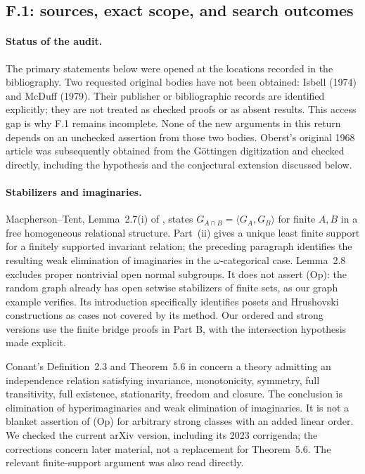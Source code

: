 \subsection{F.1: sources, exact scope, and search outcomes}

\paragraph{Status of the audit.}
The primary statements below were opened at the locations recorded
in the bibliography. Two requested original bodies have not been
obtained: Isbell (1974) and McDuff (1979).
Their publisher or bibliographic records are identified explicitly;
they are not treated as checked proofs or as absent results.
This access gap is why F.1 remains incomplete. None of the new
arguments in this return depends on an unchecked assertion from
those two bodies. Oberst's original 1968 article was subsequently
obtained from the G\"ottingen digitization and checked directly,
including the hypothesis and the conjectural extension discussed below.

\paragraph{Stabilizers and imaginaries.}
Macpherson--Tent, Lemma~2.7(i) of \cite{ABMacphersonTent}, states
$G_{A\cap B}=\langle G_A,G_B\rangle$ for finite $A,B$ in a free
homogeneous relational structure. Part~(ii) gives a unique least
finite support for a finitely supported invariant relation; the
preceding paragraph identifies the resulting weak elimination of
imaginaries in the $\omega$-categorical case. Lemma~2.8 excludes
proper nontrivial open normal subgroups. It does not assert (Op):
the random graph already has open setwise stabilizers of finite
sets, as our graph example verifies. Its introduction specifically
identifies posets and Hrushovski constructions as cases not covered
by its method. Our ordered and strong versions use the finite
bridge proofs in Part B, with the intersection hypothesis made
explicit.

Conant's Definition~2.3 and Theorem~5.6 in \cite{ABConant2017}
concern a theory admitting an independence relation satisfying
invariance, monotonicity, symmetry, full transitivity, full existence,
stationarity, freedom and closure. The conclusion is elimination of
hyperimaginaries and weak elimination of imaginaries. It is not a
blanket assertion of (Op) for arbitrary strong classes with an added
linear order. We checked the current arXiv version, including its
2023 corrigenda; the corrections concern later material, not a
replacement for Theorem~5.6. The relevant finite-support argument
was also read directly.

